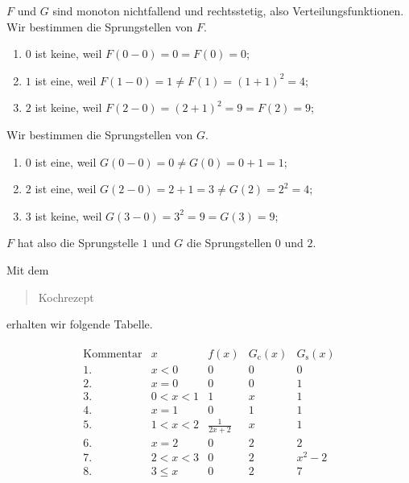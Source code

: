 \begin{solution}

$F$ und $G$ sind monoton nichtfallend und rechtsstetig, also Verteilungsfunktionen.
Wir bestimmen die Sprungstellen von $F$.

\begin{enumerate}
    \item $0$ ist keine, weil $F(0 - 0) = 0 = F(0) = 0$;
    \item $1$ ist eine,  weil $F(1 - 0) = 1 \neq F(1) = (1 + 1)^2 = 4$;
    \item $2$ ist keine, weil $F(2 - 0) = (2 + 1)^2 = 9 = F(2) = 9$;
\end{enumerate}

Wir bestimmen die Sprungstellen von $G$.

\begin{enumerate}
    \item $0$ ist eine,  weil $G(0 - 0) = 0 \neq G(0) = 0 + 1 = 1$;
    \item $2$ ist eine,  weil $G(2 - 0) = 2 + 1 = 3 \neq G(2) = 2^2 = 4$;
    \item $3$ ist keine, weil $G(3 - 0) = 3^2 = 9 = G(3) = 9$;
\end{enumerate}

$F$ hat also die Sprungstelle $1$ und $G$ die Sprungstellen $0$ und $2$.

Mit dem \blockquote{Kochrezept} erhalten wir folgende Tabelle.

\begin{align*}
    \begin{array}{c|c|c|c|c}
        \text{Kommentar}  & x         & f(x)              & G_\mathrm{c}(x) & G_\mathrm{s}(x) \\ \hline
        1.                & x < 0     & 0                 & 0               & 0               \\
        2.                & x = 0     & 0                 & 0               & 1               \\
        3.                & 0 < x < 1 & 1                 & x               & 1               \\
        4.                & x = 1     & 0                 & 1               & 1               \\
        5.                & 1 < x < 2 & \frac{1}{2 x + 2} & x               & 1               \\
        6.                & x = 2     & 0                 & 2               & 2               \\
        7.                & 2 < x < 3 & 0                 & 2               & x^2 - 2         \\
        8.                & 3 \leq x  & 0                 & 2               & 7
    \end{array}
\end{align*}


\end{solution}

